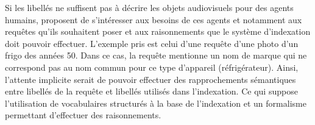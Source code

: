 Si les libellés ne suffisent pas à décrire les objets audiovisuels pour des agents humains, \citeauthor{hare:semantic-gap} proposent de s'intéresser aux besoins de ces agents et notamment aux requêtes qu'ils souhaitent poser et aux raisonnements que le système d'indexation doit pouvoir effectuer. 
L'exemple pris est celui d'une requête d'une photo d'un frigo des années 50. 
Dans ce cas, la requête mentionne un nom de marque qui ne correspond pas au nom commun pour ce type d'appareil (réfrigérateur). 
Ainsi, l'attente implicite serait de pouvoir effectuer des rapprochements sémantiques entre libellés de la requête et libellés utilisés dans l'indexation. 
Ce qui suppose l'utilisation de vocabulaires structurés à la base de l'indexation et un formalisme permettant d'effectuer des raisonnements. 

